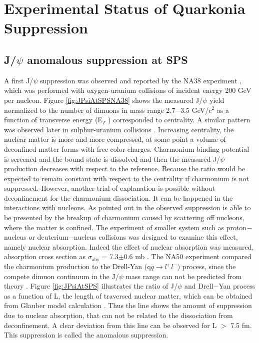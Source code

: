 \section{Experimental Status of Quarkonia Suppression}

\subsection{J/$\psi$ anomalous suppression at SPS}
A first J/$\psi$  suppression was observed and reported by the NA38 experiment
\cite{NA38}, which was performed with oxygen-uranium collisions of incident energy
200 GeV per nucleon. Figure \ref{fig:JPsiAtSPSNA38} shows the measured J/$\psi$  yield normalized
to the number of dimuons in mass range 2.7$-$3.5 GeV/c$^2$ as a function of transverse
energy (E$_T$ ) corresponded to centrality. A similar pattern was observed
later in sulphur-uranium collisions \cite{NA50}. Increasing centrality, the nuclear matter
is more and more compressed, at some point a volume of deconfined matter
forms with free color charges. Charmonium binding potential is screened and
the bound state is dissolved and then the measured J/$\psi$  production decreases
with respect to the reference. Because the ratio would be expected to remain
constant with respect to the centrality if charmonium is not suppressed.
However, another trial of explanation is possible without deconfinement
for the charmonium dissociation. It can be happened in the interactions with
nucleons. As pointed out in \cite{Khar_Carlos} the observed suppression is able to be presented
by the breakup of charmonium caused by scattering off nucleons, where
the matter is confined. The experiment of smaller system such as proton$-$nucleus
or deuterium$-$nucleus collisions was designed to examine this effect,
namely nuclear absorption. Indeed the effect of nuclear absorption was measured,
absorption cross section as $\sigma_{\mbox{abs}}$ = 7.3$\pm$0.6 mb \cite{Khar_Carlos}. 
The NA50 experiment compared the charmonium production to the Drell-Yan (q$\overline{q}\rightarrow l^+l^-$) 
process, since the compete dimuon continuum in the J/$\psi$  mass range can not be predicted
from theory \cite{NA51}. Figure \ref{fig:JPsiAtSPS} illustrates the ratio of J/$\psi$  and Drell$-$Yan
process as a function of L, the length of traversed nuclear matter, which can
be obtained from Glauber model calculation \cite{Khar_Carlos,NA51_2}. Thus the line shows the
amount of suppression due to nuclear absorption, that can not be related to
the dissociation from deconfinement. A clear deviation from this line can be
observed for L $>$ 7.5 fm. This suppression is called the anomalous suppression.

